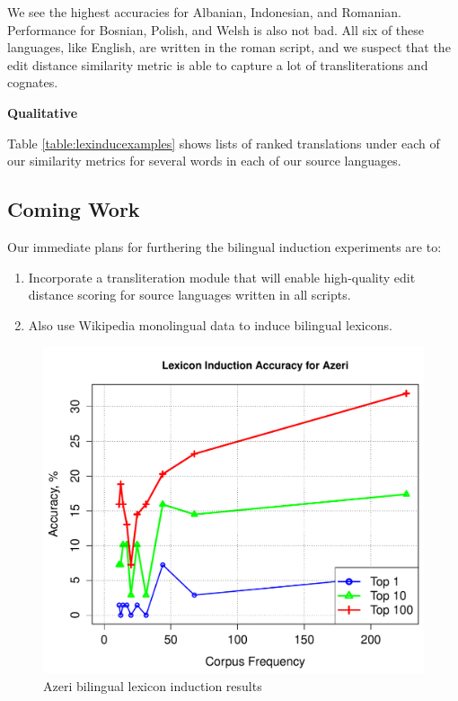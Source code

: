 \documentclass[11pt]{article}
\begin{document}
We see the highest accuracies for Albanian, Indonesian, and Romanian. Performance for Bosnian, Polish, and Welsh is also not bad. All six of these languages, like English, are written in the roman script, and we suspect that the edit distance similarity metric is able to capture a lot of transliterations and cognates. 

{\bf Qualitative} 

Table \ref{table:lexinducexamples} shows lists of ranked translations under each of our similarity metrics for several words in each of our source languages.


\subsection{Coming Work}
Our immediate plans for furthering the bilingual induction experiments are to:
\begin{enumerate}
\item{Incorporate a transliteration module that will enable high-quality edit distance scoring for source languages written in all scripts.}
\item{Also use Wikipedia monolingual data to induce bilingual lexicons.}
\end{enumerate}



\begin{figure}[h]
\begin{center}
\includegraphics[width=0.9 \linewidth]{../byFreqGraphs/az/lexinductnew.pdf}
\vskip -0.15in
\caption{Azeri bilingual lexicon induction results}
\label{fig:bli.az} 
\end{center}
\end{figure}
\end{document}
